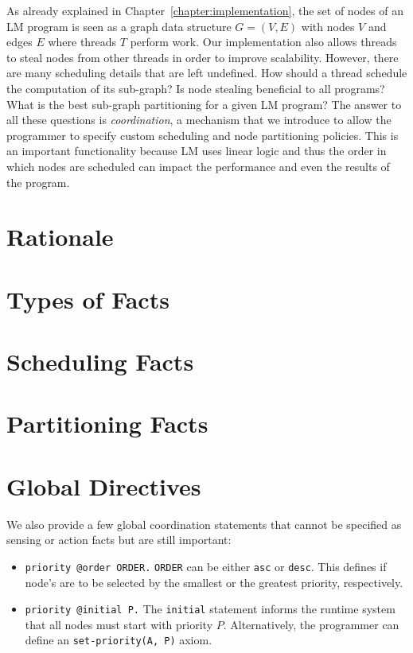 As already explained in Chapter~\ref{chapter:implementation}, the set of nodes
of an LM program is seen as a graph data structure $G = (V, E)$ with nodes $V$
and edges $E$ where threads $T$ perform work. Our implementation also allows
threads to steal nodes from other threads in order to improve scalability.
However, there are many scheduling details that are left undefined. How should a
thread schedule the computation of its sub-graph? Is node stealing beneficial to
all programs? What is the best sub-graph partitioning for a given LM program?
The answer to all these questions is \emph{coordination}, a mechanism that we
introduce to allow the programmer to specify custom scheduling and node
partitioning policies. This is an important functionality because LM uses linear
logic and thus the order in which nodes are scheduled can impact the performance
and even the results of the program.

\section{Rationale}



\section{Types of Facts}



\section{Scheduling Facts}\label{sec:coord:fifo}



\section{Partitioning Facts}


\section{Global Directives}

We also provide a few global coordination statements that cannot be specified
as sensing or action facts but are still important:

\begin{itemize}

   \item \texttt{priority @order ORDER.} \texttt{ORDER} can be either
      \texttt{asc} or \texttt{desc}. This defines if node's are to be selected
      by the smallest or the greatest priority, respectively.

   \item \texttt{priority @initial P.} The \texttt{initial} statement informs
      the runtime system that all nodes must start with priority $P$.
      Alternatively, the programmer can define an \texttt{set-priority(A, P)}
      axiom.

\end{itemize}

